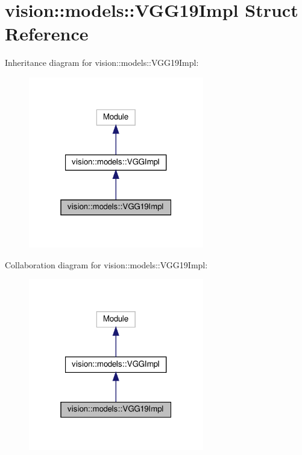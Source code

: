 \hypertarget{structvision_1_1models_1_1VGG19Impl}{}\section{vision\+:\+:models\+:\+:V\+G\+G19\+Impl Struct Reference}
\label{structvision_1_1models_1_1VGG19Impl}


Inheritance diagram for vision\+:\+:models\+:\+:V\+G\+G19\+Impl\+:
\nopagebreak
\begin{figure}[H]
\begin{center}
\leavevmode
\includegraphics[width=217pt]{structvision_1_1models_1_1VGG19Impl__inherit__graph}
\end{center}
\end{figure}


Collaboration diagram for vision\+:\+:models\+:\+:V\+G\+G19\+Impl\+:
\nopagebreak
\begin{figure}[H]
\begin{center}
\leavevmode
\includegraphics[width=217pt]{structvision_1_1models_1_1VGG19Impl__coll__graph}
\end{center}
\end{figure}
